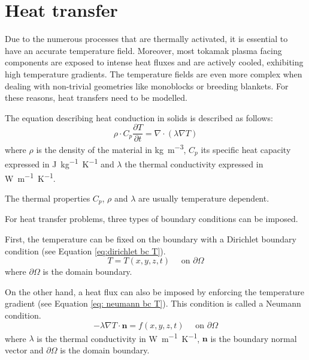 \section{Heat transfer}
Due to the numerous processes that are thermally activated, it is essential to have an accurate temperature field.
Moreover, most tokamak plasma facing components are exposed to intense heat fluxes and are actively cooled, exhibiting high temperature gradients.
The temperature fields are even more complex when dealing with non-trivial geometries like monoblocks or breeding blankets.
For these reasons, heat transfers need to be modelled.

The equation describing heat conduction in solids is described as follows:
\begin{equation}
    \rho \cdot C_p \frac{\partial T}{\partial t}=\nabla \cdot (\lambda \nabla T)
    \label{eq:heat equation}
\end{equation}
where $\rho$ is the density of the material in \si{kg.m^{-3}}, $C_p$ its specific heat capacity expressed in \si{J.kg^{-1}.K^{-1}} and $\lambda$ the thermal conductivity expressed in \si{W.m^{-1}.K^{-1}}.

The thermal properties $C_p$, $\rho$ and $\lambda$ are usually temperature dependent.

For heat transfer problems, three types of boundary conditions can be imposed.

First, the temperature can be fixed on the boundary with a Dirichlet boundary condition (see Equation \ref{eq:dirichlet bc T}).
\begin{equation}
    T = T(x, y, z, t) \quad \text { on } \partial \Omega
    \label{eq:dirichlet bc T}
\end{equation}
where $\partial \Omega$ is the domain boundary.

On the other hand, a heat flux can also be imposed by enforcing the temperature gradient (see Equation \ref{eq: neumann bc T}).
This condition is called a Neumann condition.
\begin{equation}
    -\lambda \nabla T \cdot \mathbf{n} = f(x, y, z, t) \quad \text { on } \partial \Omega
    \label{eq: neumann bc T}
\end{equation}
where $\lambda$ is the thermal conductivity in \si{W.m^{-1}.K^{-1}}, $\mathbf{n}$ is the boundary normal vector and $\partial \Omega$ is the domain boundary.


